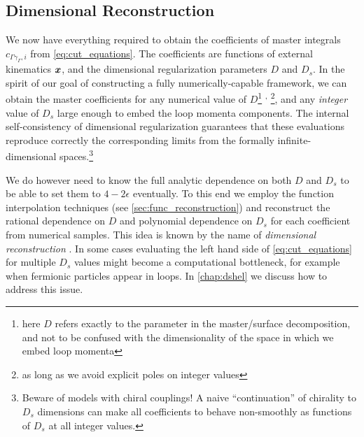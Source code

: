 \subsection{Dimensional Reconstruction}
\label{sec:dimensional_reconstruction}

We now have everything required to obtain the coefficients of master integrals 
$c_{\Gamma\gamma_\Gamma,i}$ from  \cref{eq:cut_equations}.  
The coefficients are functions of external kinematics $\vb*{x}$, and the dimensional regularization parameters $D$ and $D_s$.
In the spirit of our goal of constructing a fully numerically-capable framework, 
we can obtain the master coefficients
for any numerical value of $D$\footnote{
  here $D$ refers exactly to the parameter in the master/surface decomposition,
  and  not to be confused with the dimensionality of the space in which we embed loop momenta
}%
\textsuperscript{,}%
\footnote{as long as we avoid explicit poles on integer values},
and any  \emph{integer} value of $D_s$ large enough to embed the loop momenta components.
The internal self-consistency of dimensional regularization guarantees
that these evaluations reproduce correctly the corresponding limits from the formally infinite-dimensional spaces.\footnote{
  Beware of models with chiral couplings! A naive ``continuation'' of chirality to $D_s$ dimensions
  can make all coefficients to behave non-smoothly as functions of $D_s$ at all integer values.
}

We do however need to know the full analytic dependence on both $D$ and $D_s$ to be able
to set them to $4-2\epsilon$ eventually.
To this end we employ the function interpolation techniques (see \cref{sec:func_reconstruction})
and reconstruct the rational dependence on $D$ and polynomial dependence on $D_s$ for each coefficient from numerical samples.
This idea is known by the name of
\emph{dimensional reconstruction} \cite{Giele:2008ve,Ellis:2008ir,Boughezal:2011br,Abreu:2017xsl,Abreu:2017hqn}.
In some cases evaluating the left hand side of \cref{eq:cut_equations} for multiple $D_s$ values might become a computational bottleneck,
for example when fermionic particles appear in loops. In \cref{chap:dshel} we discuss how to address this issue.

